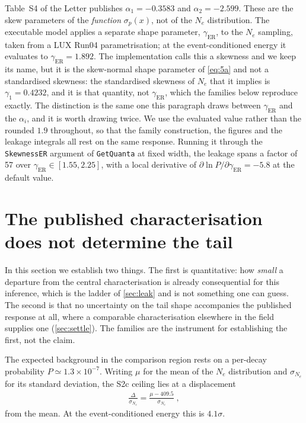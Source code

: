 \documentclass[11pt,a4paper]{article}
\begin{document}
Table~S4 of the Letter publishes \(\alpha_1=-0.3583\) and \(\alpha_2=-2.599\). These are
the skew parameters of the \emph{function} \(\sigma_p(x)\), not of the
\(N_e\) distribution. The executable model applies a separate shape
parameter, \(\gamma_\mathrm{ER}\), to the \(N_e\) sampling, taken from a
LUX Run04 parametrisation; at the event-conditioned energy it evaluates to
\(\gamma_\mathrm{ER}=1.892\). The implementation calls this a skewness and
we keep its name, but it is the skew-normal shape parameter of
\cref{eq:5a} and not a standardised skewness: the standardised skewness
of \(N_e\) that it implies is \(\gamma_1=0.4232\), and it is that
quantity, not \(\gamma_\mathrm{ER}\), which the families below reproduce
exactly. The distinction is the same one this paragraph draws between
\(\gamma_\mathrm{ER}\) and the \(\alpha_i\), and it is worth drawing
twice. We use the evaluated value
rather than the rounded \(1.9\) throughout, so that the family
construction, the figures and the leakage integrals all rest on the same
response. Running it through
the \texttt{SkewnessER} argument of \texttt{GetQuanta} at fixed width, the
leakage spans a factor of 57 over  \(\gamma_\mathrm{ER}\in[1.55,2.25]\),
with a local derivative of \(\partial\ln
P/\partial\gamma_\mathrm{ER}=-5.8\) at the default value. 

\section{The published characterisation does not determine the tail}%
\label{sec:family}

In this section we establish two things. The first is quantitative: how
\emph{small} a departure from the central characterisation is already
consequential for this inference, which is the ladder of \cref{sec:leak}
and is not something one can guess. The second is that no uncertainty on
the tail shape accompanies the published response at all, where a
comparable characterisation elsewhere in the field supplies one
(\cref{sec:settle}). The families are the instrument for establishing
the first, not the claim.

The expected background in the comparison region rests on a per-decay
probability \(P\simeq1.3\times10^{-7}\). Writing \(\mu\) for the mean of
the \(N_e\) distribution and \(\sigma_{N_e}\) for its standard
deviation, the S2c ceiling lies at a displacement
\begin{align}
    \frac{\Delta}{\sigma_{N_e}} = \frac{\mu - 409.5}{\sigma_{N_e}}\;,
\end{align}
from the mean. At the event-conditioned energy this is \(4.1\sigma\).
\end{document}
